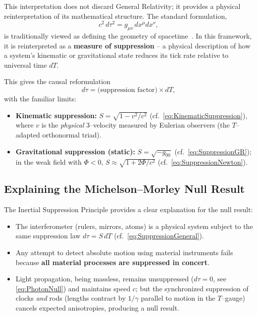 \documentclass[12pt]{article}
\theoremstyle{plain}
\begin{document}
This interpretation does not discard General Relativity; it provides a physical reinterpretation of its mathematical structure. The standard formulation,
\begin{equation}
c^2 \, d\tau^2 = g_{\mu\nu} \, dx^\mu dx^\nu,
\label{eq:MetricStandard}
\end{equation}
is traditionally viewed as defining the geometry of spacetime~\cite{Minkowski1908}. In this framework, it is reinterpreted as a \textbf{measure of suppression} – a physical description of how a system's kinematic or gravitational state reduces its tick rate relative to universal time $dT$.

\medskip
\noindent
This gives the causal reformulation
\begin{equation}
d\tau = \text{(suppression factor)} \times dT,
\label{eq:CausalReformulation}
\end{equation}
with the familiar limits:
\begin{itemize}
    \item \textbf{Kinematic suppression:} $S=\sqrt{1 - v^2/c^2}$ (cf.~\eqref{eq:KinematicSuppression}), where $v$ is the \emph{physical} 3–velocity measured by Eulerian observers (the $T$–adapted orthonormal triad).
    \item \textbf{Gravitational suppression (static):} $S=\sqrt{-g_{00}}$ (cf.~\eqref{eq:SuppressionGR}); in the weak field with \(\Phi<0\), $S\approx\sqrt{1+2\Phi/c^2}$ (cf.~\eqref{eq:SuppressionNewton}).
\end{itemize}

\subsection{Explaining the Michelson–Morley Null Result}

The Inertial Suppression Principle provides a clear explanation for the null result:

\begin{itemize}
    \item The interferometer (rulers, mirrors, atoms) is a physical system subject to the same suppression law $d\tau=S\,dT$ (cf.~\eqref{eq:SuppressionGeneral}).
    \item Any attempt to detect absolute motion using material instruments fails because \textbf{all material processes are suppressed in concert}.
    \item Light propagation, being massless, remains unsuppressed ($d\tau=0$, see \eqref{eq:PhotonNull}) and maintains speed $c$; but the synchronized suppression of clocks \emph{and} rods (lengths contract by $1/\gamma$ parallel to motion in the $T$–gauge) cancels expected anisotropies, producing a null result.
\end{itemize}
\end{document}
